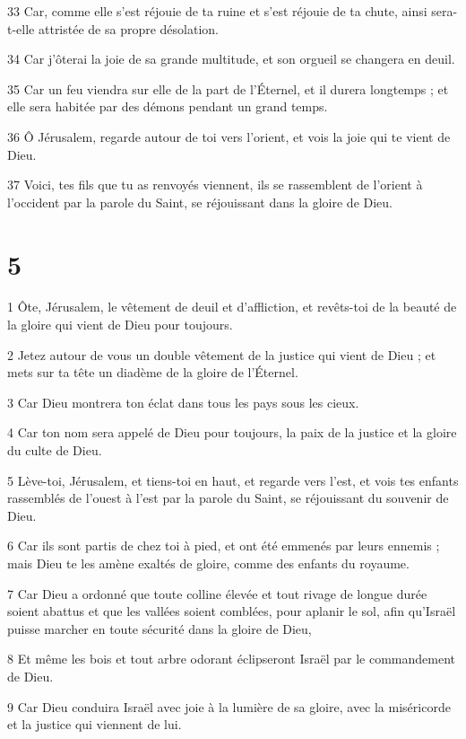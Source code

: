 \par 33 Car, comme elle s'est réjouie de ta ruine et s'est réjouie de ta chute, ainsi sera-t-elle attristée de sa propre désolation.
\par 34 Car j'ôterai la joie de sa grande multitude, et son orgueil se changera en deuil.
\par 35 Car un feu viendra sur elle de la part de l'Éternel, et il durera longtemps ; et elle sera habitée par des démons pendant un grand temps.
\par 36 Ô Jérusalem, regarde autour de toi vers l'orient, et vois la joie qui te vient de Dieu.
\par 37 Voici, tes fils que tu as renvoyés viennent, ils se rassemblent de l'orient à l'occident par la parole du Saint, se réjouissant dans la gloire de Dieu.

\chapter{5}

\par 1 Ôte, Jérusalem, le vêtement de deuil et d'affliction, et revêts-toi de la beauté de la gloire qui vient de Dieu pour toujours.
\par 2 Jetez autour de vous un double vêtement de la justice qui vient de Dieu ; et mets sur ta tête un diadème de la gloire de l'Éternel.
\par 3 Car Dieu montrera ton éclat dans tous les pays sous les cieux.
\par 4 Car ton nom sera appelé de Dieu pour toujours, la paix de la justice et la gloire du culte de Dieu.
\par 5 Lève-toi, Jérusalem, et tiens-toi en haut, et regarde vers l'est, et vois tes enfants rassemblés de l'ouest à l'est par la parole du Saint, se réjouissant du souvenir de Dieu.
\par 6 Car ils sont partis de chez toi à pied, et ont été emmenés par leurs ennemis ; mais Dieu te les amène exaltés de gloire, comme des enfants du royaume.
\par 7 Car Dieu a ordonné que toute colline élevée et tout rivage de longue durée soient abattus et que les vallées soient comblées, pour aplanir le sol, afin qu'Israël puisse marcher en toute sécurité dans la gloire de Dieu,
\par 8 Et même les bois et tout arbre odorant éclipseront Israël par le commandement de Dieu.
\par 9 Car Dieu conduira Israël avec joie à la lumière de sa gloire, avec la miséricorde et la justice qui viennent de lui.


